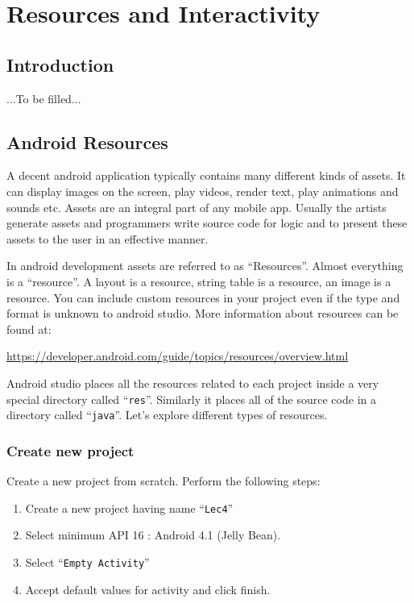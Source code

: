 \chapter{Resources and Interactivity}

\section{Introduction}
...To be filled...

\section{Android Resources}
A decent android application typically contains many different kinds of assets. It can display images on the screen, play videos, render text, play animations and sounds etc. Assets are an integral part of any mobile app. Usually the artists generate assets and programmers write source code for logic and to present these assets to the user in an effective manner.

In android development assets are referred to as ``Resources''. Almost everything is a ``resource''. A layout is a resource, string table is a resource, an image is a resource. You can include custom resources in your project even if the type and format is unknown to android studio. More information about resources can be found at:

\url{https://developer.android.com/guide/topics/resources/overview.html}

Android studio places all the resources related to each project inside a very special directory called ``\texttt{res}''. Similarly it places all of the source code in a directory called ``\texttt{java}''. Let's explore different types of resources.

\subsection{Create new project}
\label{RAI:createProj}

Create a new project from scratch. Perform the following steps:
\begin{enumerate}
	\item Create a new project having name ``\texttt{Lec4}''
	\item Select minimum API 16 : Android 4.1 (Jelly Bean).
	\item Select ``\texttt{Empty Activity}''
	\item Accept default values for activity and click finish. \\
\end{enumerate}

